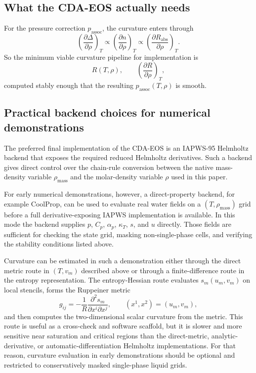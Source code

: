 \documentclass[12pt]{article}
\begin{document}
\subsection{What the CDA-EOS actually needs}

For the pressure correction $p_{\mathrm{assoc}}$, the curvature enters through
\begin{equation}
  \left(\frac{\partial\Delta}{\partial\rho}\right)_T
  \propto
  \left(\frac{\partial n}{\partial\rho}\right)_T
  \propto
  \left(\frac{\partial R_{\mathrm{abs}}}{\partial\rho}\right)_T.
\end{equation}
So the minimum viable curvature pipeline for implementation is
\begin{equation}
  R(T,\rho),\qquad
  \left(\frac{\partial R}{\partial\rho}\right)_T,
\end{equation}
computed stably enough that the resulting $p_{\mathrm{assoc}}(T,\rho)$ is smooth.

\subsection{Practical backend choices for numerical demonstrations}

The preferred final implementation of the CDA-EOS is an IAPWS-95 Helmholtz backend that exposes the required reduced Helmholtz derivatives. Such a backend gives direct control over the chain-rule conversion between the native mass-density variable $\rho_{\mathrm{mass}}$ and the molar-density variable $\rho$ used in this paper.

For early numerical demonstrations, however, a direct-property backend, for example CoolProp, can be used to evaluate real water fields on a $(T,\rho_{\mathrm{mass}})$ grid before a full derivative-exposing IAPWS implementation is available. In this mode the backend supplies $p$, $C_p$, $\alpha_p$, $\kappa_T$, $s$, and $u$ directly. Those fields are sufficient for checking the state grid, masking non-single-phase cells, and verifying the stability conditions listed above.

Curvature can be estimated in such a demonstration either through the direct metric route in $(T,v_m)$ described above or through a finite-difference route in the entropy representation. The entropy-Hessian route evaluates $s_m(u_m,v_m)$ on local stencils, forms the Ruppeiner metric
\begin{equation}
  g_{ij}=-\frac{1}{R}\frac{\partial^2 s_m}{\partial x^i\partial x^j},
  \qquad (x^1,x^2)=(u_m,v_m),
\end{equation}
and then computes the two-dimensional scalar curvature from the metric. This route is useful as a cross-check and software scaffold, but it is slower and more sensitive near saturation and critical regions than the direct-metric, analytic-derivative, or automatic-differentiation Helmholtz implementations. For that reason, curvature evaluation in early demonstrations should be optional and restricted to conservatively masked single-phase liquid grids.
\end{document}
